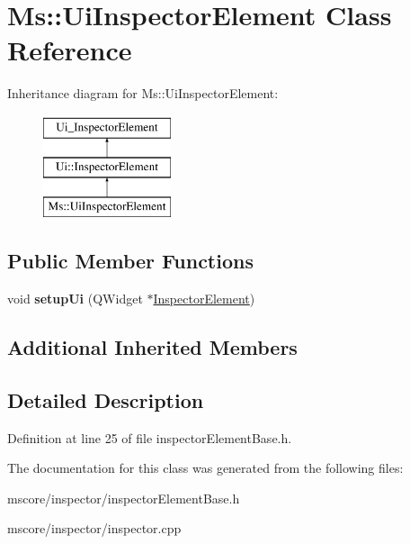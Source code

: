 \hypertarget{class_ms_1_1_ui_inspector_element}{}\section{Ms\+:\+:Ui\+Inspector\+Element Class Reference}
\label{class_ms_1_1_ui_inspector_element}
Inheritance diagram for Ms\+:\+:Ui\+Inspector\+Element\+:\begin{figure}[H]
\begin{center}
\leavevmode
\includegraphics[height=3.000000cm]{class_ms_1_1_ui_inspector_element}
\end{center}
\end{figure}
\subsection*{Public Member Functions}
\begin{DoxyCompactItemize}
\item 
\mbox{\label{class_ms_1_1_ui_inspector_element_a047a8e0080c2aa8171cbe52dea7ad7f3}} 
void {\bfseries setup\+Ui} (Q\+Widget $\ast$\hyperlink{class_ms_1_1_inspector_element}{Inspector\+Element})
\end{DoxyCompactItemize}
\subsection*{Additional Inherited Members}


\subsection{Detailed Description}


Definition at line 25 of file inspector\+Element\+Base.\+h.



The documentation for this class was generated from the following files\+:\begin{DoxyCompactItemize}
\item 
mscore/inspector/inspector\+Element\+Base.\+h\item 
mscore/inspector/inspector.\+cpp\end{DoxyCompactItemize}
